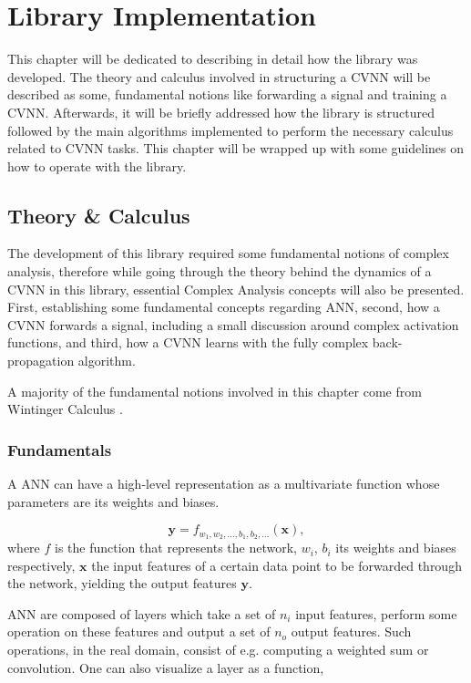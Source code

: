 \chapter{Library Implementation}
\label{chap:Chapter3}

This chapter will be dedicated to describing in detail how the library was developed. The theory and calculus involved in structuring a \gls{CVNN} will be described as some, fundamental notions like forwarding a signal and training a \gls{CVNN}. Afterwards, it will be briefly addressed how the library is structured followed by the main algorithms implemented to perform the necessary calculus related to \gls{CVNN} tasks. This chapter will be wrapped up with some guidelines on how to operate with the library.

\section{Theory \& Calculus}
The development of this library required some fundamental notions of complex analysis, therefore while going through the theory behind the dynamics of a \gls{CVNN}  in this library, essential Complex Analysis concepts will also be presented. First, establishing some fundamental concepts regarding \gls{ANN}, second, how a \gls{CVNN} forwards a signal, including a small discussion around complex activation functions, and third, how a \gls{CVNN} learns with the fully complex back-propagation algorithm.

A majority of the fundamental notions involved in this chapter come from Wintinger Calculus \parencite{wirtinger1927formalen}.

\subsection{Fundamentals}
\label{subsec:fundamentals}
A \gls{ANN} can have a high-level representation  as a multivariate function whose parameters are its weights and biases.

\begin{equation}
	\mathbf{y} = f_{w_{1}, w_{2}, ..., b_{1}, b_{2}, ...}(\mathbf{x}),
	\label{eq:network}
\end{equation}
where $ f $ is the function that represents the network, $ w_{i} $, $ b_{i} $ its weights and biases respectively, $ \mathbf{x} $ the input features of a certain data point to be forwarded through the network, yielding the output features $ \mathbf{y} $. 

\gls{ANN} are composed of layers which take a set of $ n_i $ input features, perform some operation on these features and output a set of $ n_o $ output features. Such operations, in the real domain, consist of e.g. computing a weighted sum or convolution. One can also visualize a layer as a function,

